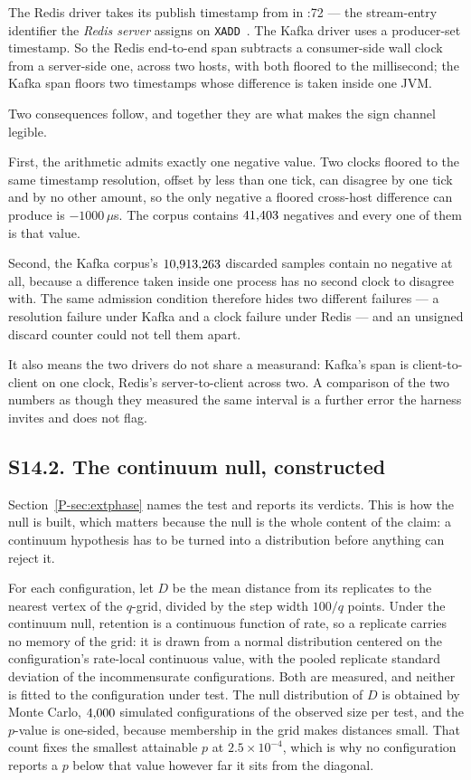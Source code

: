\documentclass[10pt,journal,onecolumn]{IEEEtran}
\newcommand{\kafka}{Kafka}
\newcommand{\redis}{Redis}
\newcommand{\mainPhase}{\ref{P-sec:extphase}}            %
\begin{document}
The \redis{} driver takes its publish timestamp from  in
:72 --- the stream-entry identifier the \emph{\redis{}
server} assigns on \texttt{XADD}~\cite{openmessaging2018}. The \kafka{} driver uses a
producer-set timestamp. So the \redis{} end-to-end span subtracts a consumer-side wall clock from
a server-side one, across two hosts, with both floored to the millisecond; the \kafka{} span
floors two timestamps whose difference is taken inside one JVM.

Two consequences follow, and together they are what makes the sign channel legible.

First, the arithmetic admits exactly one negative value. Two clocks floored to the same
timestamp resolution, offset by less than one tick, can disagree by one tick and by no other amount, so
the only negative a floored cross-host difference can produce is $-1000\,\mu$s. The corpus
contains $41{,}403$ negatives and every one of them is that value.

Second, the \kafka{} corpus's $10{,}913{,}263$ discarded samples contain no negative at
all, because a difference taken inside one process has no second clock to disagree with. The
same admission condition therefore hides two different failures --- a resolution failure under \kafka{} and
a clock failure under \redis{} --- and an unsigned discard counter could not tell them apart.

It also means the two drivers do not share a measurand: \kafka{}'s span is client-to-client on
one clock, \redis{}'s server-to-client across two. A comparison of the two numbers as though
they measured the same interval is a further error the harness invites and does not flag.


\subsection{S14.2. The continuum null, constructed}
\label{sec:permnull}

Section~\mainPhase{} names the test and reports its verdicts. This is how the null is
built, which matters because the null is the whole content of the claim: a continuum
hypothesis has to be turned into a distribution before anything can reject it.

For each configuration, let $D$ be the mean distance from its replicates to the nearest vertex of the
$q$-grid, divided by the step width $100/q$ points. Under the continuum null, retention is a
continuous function of rate, so a replicate carries no memory of the grid: it is drawn from a
normal distribution centered on the configuration's rate-local continuous value, with the pooled
replicate standard deviation of the incommensurate configurations. Both are measured, and
neither is fitted to the configuration under test. The null distribution of $D$ is obtained by
Monte Carlo, $4{,}000$ simulated configurations of the observed size per test, and the $p$-value
is one-sided, because membership in the grid makes distances small. That count fixes the
smallest attainable $p$ at $2.5\times10^{-4}$, which is why no configuration reports a $p$ below
that value however far it sits from the diagonal.
\end{document}

